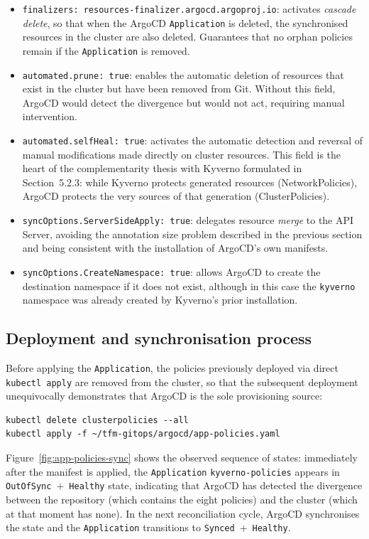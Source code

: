 \begin{itemize}
  \item \texttt{finalizers: resources-finalizer.\allowbreak{}argocd.argoproj.io}: activates \textit{cascade delete}, so that when the ArgoCD \texttt{Application} is deleted, the synchronised resources in the cluster are also deleted. Guarantees that no orphan policies remain if the \texttt{Application} is removed.
  \item \texttt{automated.prune:\,true}: enables the automatic deletion of resources that exist in the cluster but have been removed from Git. Without this field, ArgoCD would detect the divergence but would not act, requiring manual intervention.
  \item \texttt{automated.selfHeal:\,true}: activates the automatic detection and reversal of manual modifications made directly on cluster resources. This field is the heart of the complementarity thesis with Kyverno formulated in Section~5.2.3: while Kyverno protects generated resources (NetworkPolicies), ArgoCD protects the very sources of that generation (ClusterPolicies).
  \item \texttt{syncOptions.ServerSideApply:\,true}: delegates resource \textit{merge} to the API Server, avoiding the annotation size problem described in the previous section and being consistent with the installation of ArgoCD's own manifests.
  \item \texttt{syncOptions.CreateNamespace:\,true}: allows ArgoCD to create the destination namespace if it does not exist, although in this case the \texttt{kyverno} namespace was already created by Kyverno's prior installation.
\end{itemize}

\subsection{Deployment and synchronisation process}

Before applying the \texttt{Application}, the policies previously deployed via direct \texttt{kubectl apply} are removed from the cluster, so that the subsequent deployment unequivocally demonstrates that ArgoCD is the sole provisioning source:

\begin{lstlisting}
kubectl delete clusterpolicies --all
kubectl apply -f ~/tfm-gitops/argocd/app-policies.yaml
\end{lstlisting}

Figure~\ref{fig:app-policies-sync} shows the observed sequence of states: immediately after the manifest is applied, the \texttt{Application} \texttt{kyverno-policies} appears in \texttt{OutOfSync}~+~\texttt{Healthy} state, indicating that ArgoCD has detected the divergence between the repository (which contains the eight policies) and the cluster (which at that moment has none). In the next reconciliation cycle, ArgoCD synchronises the state and the \texttt{Application} transitions to \texttt{Synced}~+~\texttt{Healthy}.

